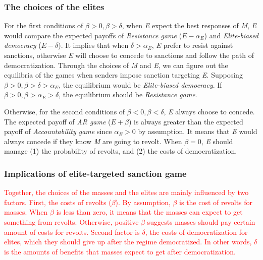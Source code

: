 \documentclass[11pt, letterpage]{article}
\begin{document}
\subsubsection*{The choices of the elites}
	
For the first conditions of $\beta > 0, \beta > \delta$, when \textit{E} expect the best responses of \textit{M}, \textit{E} would compare the expected payoffs of \textit{Resistance game} ($E-\alpha_{E}$) and \textit{Elite-biased democracy} ($E-\delta$). It implies that when $\delta > \alpha_{E}$, \textit{E} prefer to resist against sanctions, otherwise \textit{E} will choose to concede to sanctions and follow the path of democratization. Through the choices of \textit{M} and \textit{E}, we can figure out the equilibria of the games when senders impose sanction targeting \textit{E}. Supposing $\beta > 0, \beta > \delta > \alpha_{E}$, the equilibrium would be \textit{Elite-biased democracy}. If $\beta > 0, \beta > \alpha_{E} > \delta$, the equilibrium should be \textit{Resistance game}.
	
Otherwise, for the second conditions of $\beta <0, \beta < \delta$, \textit{E} always choose to concede. The expected payoff of \textit{AR game} ($E+\beta$) is always greater than the expected payoff of \textit{Accountability game} since $\alpha_{E} > 0$ by assumption. It means that \textit{E} would always concede if they know \textit{M} are going to revolt. When $\beta = 0$, \textit{E} should manage (1) the probability of revolts, and (2) the costs of democratization.
	
\subsubsection*{Implications of elite-targeted sanction game}

\textcolor{red}{Together, the choices of the masses and the elites are mainly influenced by two factors. First, the costs of revolts ($\beta$). By assumption, $\beta$ is the cost of revolts for masses. When $\beta$ is less than zero, it means that the masses can expect to get something from revolts. Otherwise, positive $\beta$ suggests masses should pay certain amount of costs for revolts. Second factor is $\delta$, the costs of democratization for elites, which they should give up after the regime democratized. In other words, $\delta$ is the amounts of benefits that masses expect to get after democratization.}
\end{document}
